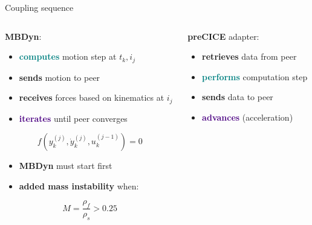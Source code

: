 \documentclass[10pt,t]{beamer}
\begin{document}
\begin{frame}{Coupling sequence}
    


\begin{columns}


\begin{column}{0.5\textwidth}
\textcolor{dorange}{\textbf{MBDyn}}:

\vspace{0.2cm}

\begin{itemize}
    \item \textcolor{teal}{\textbf{computes}} motion step at $t_k, i_j$
    \item \textcolor{fgreen}{\textbf{sends}} motion to peer
    \item \textcolor{dblue}{\textbf{receives}} forces based on kinematics at $i_j$
    \item \textcolor{indigo}{\textbf{iterates}} until peer converges
\end{itemize}

$$f\left(y_k^{(j)},\dot{y}_k^{(j)},u_k^{(j-1)}\right)=0$$

\pause

\begin{itemize}
    \item \textcolor{dorange}{\textbf{MBDyn}} must start first
    \item \textbf{added mass instability} when:
\end{itemize}

$$M = \frac{\rho_f}{\rho_s} > 0.25$$


\end{column}

\pause

\begin{column}{0.5\textwidth}
\textcolor{pblue}{\textbf{preCICE}} adapter:

\vspace{0.2cm}

\begin{itemize}
    \item \textcolor{dblue}{\textbf{retrieves}} data from peer
    \item \textcolor{teal}{\textbf{performs}} computation step
    \item \textcolor{fgreen}{\textbf{sends}} data to peer
    \item \textcolor{indigo}{\textbf{advances}} (acceleration)
\end{itemize}


\end{column}
\end{columns}
\end{frame}
\end{document}
